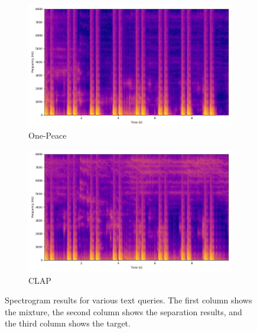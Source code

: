 \begin{figure}[htbp]
\begin{subfigure}[b]{0.18\textwidth}
        \includegraphics[width=\textwidth]{plots/onepeace_best_sdr/onepeace sep_spectrogram.png}
        \caption*{One-Peace}
    \end{subfigure}
    \begin{subfigure}[b]{0.18\textwidth}
        \centering
        \includegraphics[width=\textwidth]{plots/onepeace_best_sdr/clap sep_spectrogram.png}
        \caption*{CLAP}
    \end{subfigure}
    

    \caption{Spectrogram results for various text queries. The first column shows the mixture, the second column shows the separation results, and the third column shows the target.}
    
    \label{fig:separation_results}

\end{figure}

